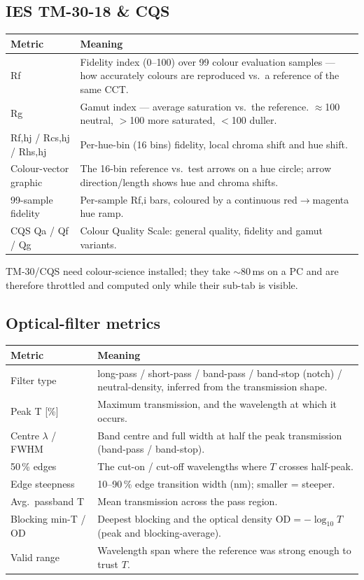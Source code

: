 \documentclass[12pt,a4paper]{article}
\begin{document}
\subsection{IES TM-30-18 \& CQS}
\begin{longtable}{@{}p{3.0cm}p{11.8cm}@{}}
\toprule \textbf{Metric} & \textbf{Meaning}\\ \midrule\endhead
Rf & Fidelity index (0--100) over 99 colour evaluation samples --- how accurately colours are reproduced vs.\ a reference of the same CCT.\\
Rg & Gamut index --- average saturation vs.\ the reference. $\approx$100 neutral, $>$100 more saturated, $<$100 duller.\\
Rf,hj / Rcs,hj / Rhs,hj & Per-hue-bin (16 bins) fidelity, local chroma shift and hue shift.\\
Colour-vector graphic & The 16-bin reference vs.\ test arrows on a hue circle; arrow direction/length shows hue and chroma shifts.\\
99-sample fidelity & Per-sample Rf,i bars, coloured by a continuous red$\to$magenta hue ramp.\\
CQS Qa / Qf / Qg & Colour Quality Scale: general quality, fidelity and gamut variants.\\
\bottomrule
\end{longtable}
TM-30/CQS need colour-science installed; they take $\sim$80\,ms on a PC and are
therefore throttled and computed only while their sub-tab is visible.

\subsection{Optical-filter metrics}
\begin{longtable}{@{}p{3.4cm}p{11.4cm}@{}}
\toprule \textbf{Metric} & \textbf{Meaning}\\ \midrule\endhead
Filter type & long-pass / short-pass / band-pass / band-stop (notch) / neutral-density, inferred from the transmission shape.\\
Peak T [\%] & Maximum transmission, and the wavelength at which it occurs.\\
Centre $\lambda$ / FWHM & Band centre and full width at half the peak transmission (band-pass / band-stop).\\
50\,\% edges & The cut-on / cut-off wavelengths where $T$ crosses half-peak.\\
Edge steepness & 10--90\,\% edge transition width (nm); smaller = steeper.\\
Avg.\ passband T & Mean transmission across the pass region.\\
Blocking min-T / OD & Deepest blocking and the optical density $\mathrm{OD}=-\log_{10}T$ (peak and blocking-average).\\
Valid range & Wavelength span where the reference was strong enough to trust $T$.\\
\bottomrule
\end{longtable}
\end{document}
